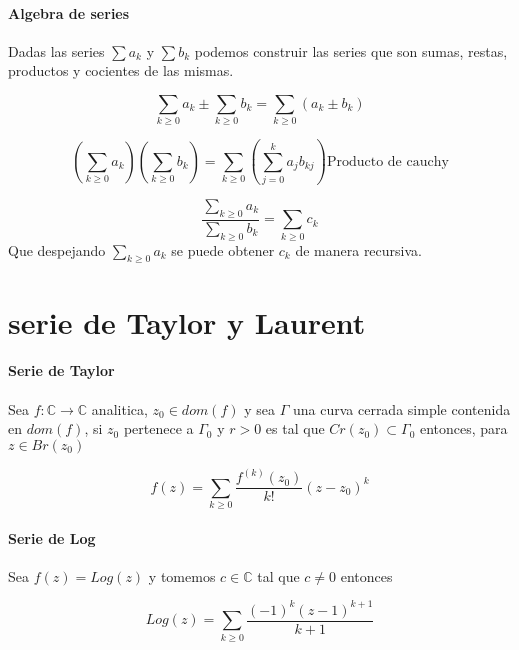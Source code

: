 \documentclass[10pt]{article}
\begin{document}
\paragraph{Algebra de series}
Dadas las series $\sum a_k$ y $\sum b_k$ podemos construir las series que son sumas, restas, productos y cocientes de las mismas.

\begin{equation*}
\sum_{k \geq 0} a_k \pm \sum_{k \geq 0} b_k = \sum_{k \geq 0} (a_k \pm b_k)
\end{equation*}
 
\begin{equation*}
\left( \sum_{k \geq 0} a_k \right) \left( \sum_{k \geq 0} b_k \right) = \sum_{k \geq 0} \left( \sum_{j = 0}^k a_j b_{k j} \right) \text{Producto de cauchy}
\end{equation*}

\begin{equation*}
	\dfrac{\sum_{k\geq 0} a_k}{\sum_{k\geq 0} b_k} = \sum_{k\geq 0}c_k
\end{equation*}
Que despejando $\sum_{k\geq 0} a_k$ se puede obtener $c_k$ de manera recursiva.
\section{serie de Taylor y Laurent}

\paragraph{Serie de Taylor}

Sea $f: \mathbb{C} \rightarrow \mathbb{C}$ analitica, $z_0 \in dom(f)$ y sea $\Gamma$ una curva cerrada simple contenida en $dom(f)$, si $z_0$ pertenece a $\Gamma_0$ y $r > 0$ es tal que $Cr(z_0) \subset \Gamma_0$ entonces, para $z \in  Br(z_0)$

\begin{equation*}
	f(z) = \sum_{k\geq 0} \dfrac{f^{(k)} (z_0)}{k!} (z-z_0)^k
\end{equation*}

\paragraph{Serie de Log} Sea $f(z) = Log(z)$ y tomemos $c \in \mathbb{C}$ tal que $c \neq 0$ entonces

\begin{equation*}
	Log(z) = \sum_{k \geq 0} \dfrac{(-1)^k (z-1)^{k+1}}{k+1}
\end{equation*}
\end{document}
